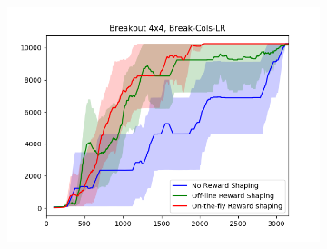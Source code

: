 \begin{figure}[h]
	\begin{subfigure}[b]{0.3\textwidth}
		\includegraphics[width=\textwidth]{images/rs-comparison_b44.png}
	\end{subfigure}
\end{figure}

\section{\Sapientino}
\section{\Minecraft}